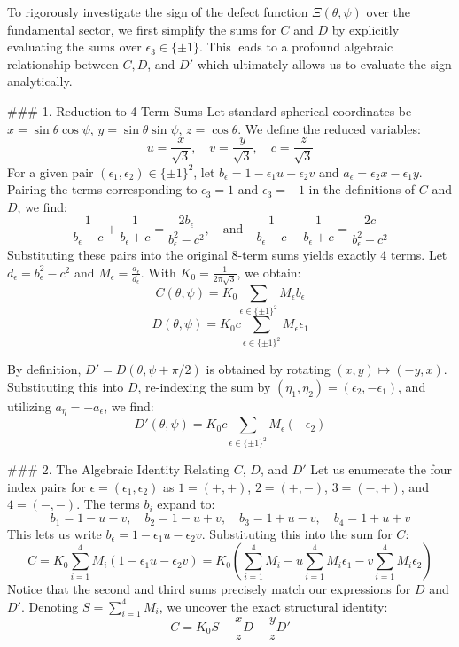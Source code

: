 To rigorously investigate the sign of the defect function $\Xi(\theta, \psi)$ over the fundamental sector, we first simplify the sums for $C$ and $D$ by explicitly evaluating the sums over $\epsilon_3 \in \{\pm 1\}$. This leads to a profound algebraic relationship between $C, D$, and $D'$ which ultimately allows us to evaluate the sign analytically.

### 1. Reduction to 4-Term Sums
Let standard spherical coordinates be $x = \sin\theta\cos\psi$, $y = \sin\theta\sin\psi$, $z = \cos\theta$. We define the reduced variables:
$$ u = \frac{x}{\sqrt{3}}, \quad v = \frac{y}{\sqrt{3}}, \quad c = \frac{z}{\sqrt{3}} $$
For a given pair $(\epsilon_1, \epsilon_2) \in \{\pm 1\}^2$, let $b_{\epsilon} = 1 - \epsilon_1 u - \epsilon_2 v$ and $a_{\epsilon} = \epsilon_2 x - \epsilon_1 y$. 
Pairing the terms corresponding to $\epsilon_3 = 1$ and $\epsilon_3 = -1$ in the definitions of $C$ and $D$, we find:
$$ \frac{1}{b_{\epsilon} - c} + \frac{1}{b_{\epsilon} + c} = \frac{2b_{\epsilon}}{b_{\epsilon}^2 - c^2}, \quad \text{and} \quad \frac{1}{b_{\epsilon} - c} - \frac{1}{b_{\epsilon} + c} = \frac{2c}{b_{\epsilon}^2 - c^2} $$
Substituting these pairs into the original 8-term sums yields exactly 4 terms. Let $d_{\epsilon} = b_{\epsilon}^2 - c^2$ and $M_{\epsilon} = \frac{a_{\epsilon}}{d_{\epsilon}}$. With $K_0 = \frac{1}{2\pi\sqrt{3}}$, we obtain:
$$ C(\theta,\psi) = K_0 \sum_{\epsilon \in \{\pm 1\}^2} M_{\epsilon} b_{\epsilon} $$
$$ D(\theta,\psi) = K_0 c \sum_{\epsilon \in \{\pm 1\}^2} M_{\epsilon} \epsilon_1 $$

By definition, $D' = D(\theta, \psi+\pi/2)$ is obtained by rotating $(x,y) \mapsto (-y, x)$. Substituting this into $D$, re-indexing the sum by $(\eta_1, \eta_2) = (\epsilon_2, -\epsilon_1)$, and utilizing $a_{\eta} = -a_{\epsilon}$, we find:
$$ D'(\theta,\psi) = K_0 c \sum_{\epsilon \in \{\pm 1\}^2} M_{\epsilon} (-\epsilon_2) $$

### 2. The Algebraic Identity Relating $C$, $D$, and $D'$
Let us enumerate the four index pairs for $\epsilon = (\epsilon_1, \epsilon_2)$ as $1=(+,+)$, $2=(+,-)$, $3=(-,+)$, and $4=(-,-)$. The terms $b_i$ expand to:
$$ b_1 = 1 - u - v, \quad b_2 = 1 - u + v, \quad b_3 = 1 + u - v, \quad b_4 = 1 + u + v $$
This lets us write $b_{\epsilon} = 1 - \epsilon_1 u - \epsilon_2 v$. Substituting this into the sum for $C$:
$$ C = K_0 \sum_{i=1}^4 M_i (1 - \epsilon_1 u - \epsilon_2 v) = K_0 \left( \sum_{i=1}^4 M_i - u \sum_{i=1}^4 M_i \epsilon_1 - v \sum_{i=1}^4 M_i \epsilon_2 \right) $$
Notice that the second and third sums precisely match our expressions for $D$ and $D'$. Denoting $S = \sum_{i=1}^4 M_i$, we uncover the exact structural identity:
$$ C = K_0 S - \frac{x}{z} D + \frac{y}{z} D' $$

